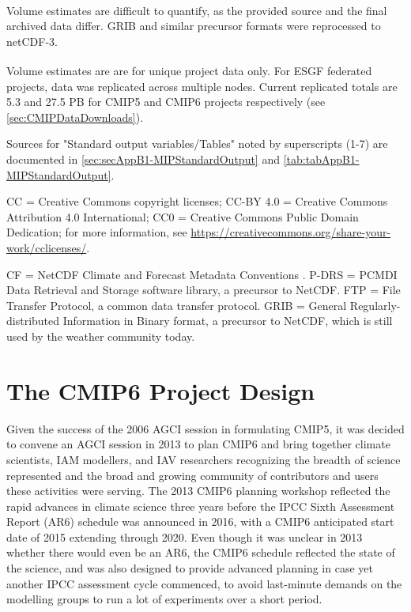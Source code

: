 \documentclass[manuscript]{copernicus}
\newcommand{\mycomment}[1]{}
\begin{document}
\begin{table}[htp]
{{}\textsuperscript{\textdagger}Volume estimates are difficult to quantify, as the provided source and the final archived data differ. GRIB and similar precursor formats were reprocessed to netCDF-3.

{}\textsuperscript{\textdaggerdbl}Volume estimates are are for unique project data only. For ESGF federated projects, data was replicated across multiple nodes. Current replicated totals are 5.3 and 27.5 PB for CMIP5 and CMIP6 projects respectively (see \autoref{sec:CMIPDataDownloads}).

Sources for "Standard output variables/Tables" noted by superscripts (1-7) are documented in \autoref{sec:secAppB1-MIPStandardOutput} and \autoref{tab:tabAppB1-MIPStandardOutput}.

CC = Creative Commons copyright licenses; CC-BY 4.0 = Creative Commons Attribution 4.0 International; CC0 = Creative Commons Public Domain Dedication; for more information, see \url{https://creativecommons.org/share-your-work/cclicenses/}.

CF = NetCDF Climate and Forecast Metadata Conventions \citep{eaton_netcdf_2024}. P-DRS = PCMDI Data Retrieval and Storage software library, a precursor to NetCDF. FTP = File Transfer Protocol, a common data transfer protocol. GRIB = General Regularly-distributed Information in Binary format, a precursor to NetCDF, which is still used by the weather community today.}
\end{table}
\mycomment{
Also WGNE diagnostics, which likely built the original AMIP output list - https://web.archive.org/web/19970825000822/http://www-pcmdi.llnl.gov/amip/output/outlist.html and https://pcmdi.llnl.gov/mips/amip/OUTPUT/WGNEDIAGS/
}


\section{The CMIP6 Project Design}
\label{sec:cmip6ProjectDesign}

Given the success of the 2006 AGCI session in formulating CMIP5, it was decided to convene an AGCI session in 2013 to plan CMIP6 and bring together climate scientists, IAM modellers, and IAV researchers recognizing the breadth of science represented and the broad and growing community of contributors and users these activities were serving. The 2013 CMIP6 planning workshop reflected the rapid advances in climate science three years before the IPCC Sixth Assessment Report (AR6) schedule was announced in 2016, with a CMIP6 anticipated start date of 2015 extending through 2020. Even though it was unclear in 2013 whether there would even be an AR6, the CMIP6 schedule reflected the state of the science, and was also designed to provide advanced planning in case yet another IPCC assessment cycle commenced, to avoid last-minute demands on the modelling groups to run a lot of experiments over a short period.
\end{document}
